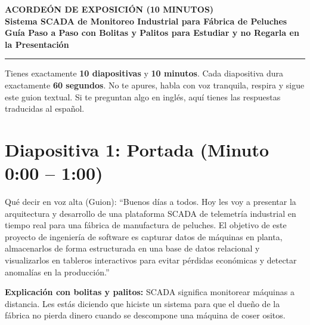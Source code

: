 \documentclass[10pt,letterpaper]{article}
\begin{document}
\begin{center}
    {\LARGE \textbf{\color{navyblue}ACORDEÓN DE EXPOSICIÓN (10 MINUTOS)}} \\[0.2cm]
    {\large \textbf{\color{darkslate}Sistema SCADA de Monitoreo Industrial para Fábrica de Peluches}} \\[0.2cm]
    {\small \textbf{Guía Paso a Paso con Bolitas y Palitos para Estudiar y no Regarla en la Presentación}} \\[0.3cm]
    \rule{\textwidth}{1pt}
\end{center}

\vspace{-0.3cm}
\begin{tcolorbox}[colback=leafgreen!10,colframe=leafgreen,title=\textbf{INSTRUCCIÓN GENERAL: REGLA DE 1 MINUTO POR DIAPOSITIVA}]
Tienes exactamente \textbf{10 diapositivas} y \textbf{10 minutos}. Cada diapositiva dura exactamente \textbf{60 segundos}. 
No te apures, habla con voz tranquila, respira y sigue este guion textual. Si te preguntan algo en inglés, aquí tienes las respuestas traducidas al español.
\end{tcolorbox}

\section*{Diapositiva 1: Portada (Minuto 0:00 -- 1:00)}
\begin{guionbox}{Qué decir en voz alta (Guion):}
``Buenos días a todos. Hoy les voy a presentar la arquitectura y desarrollo de una plataforma SCADA de telemetría industrial en tiempo real para una fábrica de manufactura de peluches. El objetivo de este proyecto de ingeniería de software es capturar datos de máquinas en planta, almacenarlos de forma estructurada en una base de datos relacional y visualizarlos en tableros interactivos para evitar pérdidas económicas y detectar anomalías en la producción.''
\end{guionbox}
\textbf{Explicación con bolitas y palitos:} SCADA significa monitorear máquinas a distancia. Les estás diciendo que hiciste un sistema para que el dueño de la fábrica no pierda dinero cuando se descompone una máquina de coser ositos.
\end{document}
